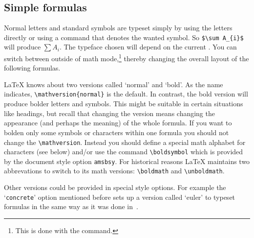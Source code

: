  \subsection{Simple formulas}

 Normal letters and standard symbols are typeset simply by using the
 letters directly or using a command that denotes the wanted symbol. So
 \verb+$\sum A_{i}$+ will produce $\sum A_{i}$. The typeface chosen
 will depend on the current . You can switch
 between  outside of math mode,\footnote{This is done
 with the command\hfil{}.}  thereby changing the overall layout of the
 following formulas.

%
%

 \LaTeX{} knows about two versions called `normal' and `bold'. As the
 name indicates, \verb+\mathversion{normal}+ is the default. In contrast,
 the bold version will produce bolder letters and symbols.  This might
 be suitable in certain situations like headings,
 but recall that changing the
 version means changing the appearance (and perhaps the meaning)
 of the whole formula.
 If you want to bolden only some symbols or characters within
 one formula you should not change the \verb=\mathversion=.
 Instead you should
 define a special math alphabet for characters
 (see below) and/or use the command \verb=\boldsymbol= which is
 provided by the document style option {\tt amsbsy}.
 For historical reasons \LaTeX{} maintains two abbrevations to switch
 to its math versions: \verb+\boldmath+ and \verb+\unboldmath+.

 Other versions could be provided in special style options. For
 example the `{\tt concrete}' option mentioned before sets up
 a version called `euler' to typeset formulas in the same way as it
 was done in~\cite{ConcreteMath}.


